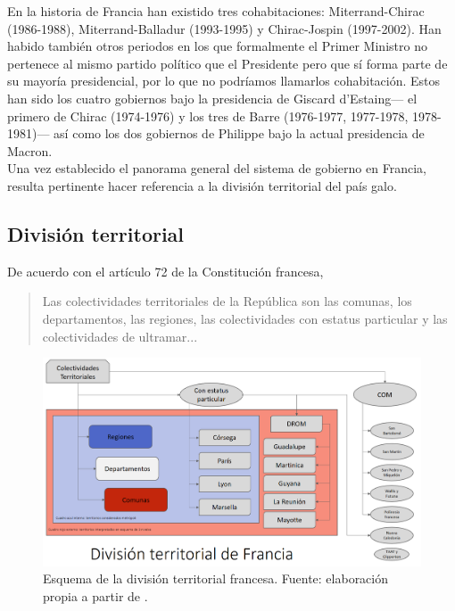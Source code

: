 En la historia de Francia han existido tres cohabitaciones: Miterrand-Chirac (1986-1988), Miterrand-Balladur (1993-1995) y Chirac-Jospin (1997-2002). Han habido también otros periodos en los que formalmente el Primer Ministro no pertenece al mismo partido político que el Presidente pero que sí forma parte de su mayoría presidencial, por lo que no podríamos llamarlos cohabitación. Estos han sido los cuatro gobiernos bajo la presidencia de Giscard d'Estaing--- el primero de Chirac (1974-1976) y los tres de Barre (1976-1977, 1977-1978, 1978-1981)--- así como los dos gobiernos de Philippe bajo la actual presidencia de Macron.\\

Una vez establecido el panorama general del sistema de gobierno en Francia, resulta pertinente hacer referencia a la división territorial del país galo. 

\subsection{División territorial}

De acuerdo con el artículo 72 de la Constitución francesa, 

\begin{quote}
Las colectividades territoriales de la República son las comunas, los departamentos, las regiones, las colectividades con estatus particular y las colectividades de ultramar...
\end{quote}

\begin{figure}[h]
	\centering
	\includegraphics[scale=0.25]{Figs/FN_Francia/Div_Terr_Fr_v2}
	\caption{Esquema de la división territorial francesa. Fuente: elaboración propia a partir de \textcite{AN17b}.}
	\label{fig:Div_Terr_Fr}	
\end{figure}

